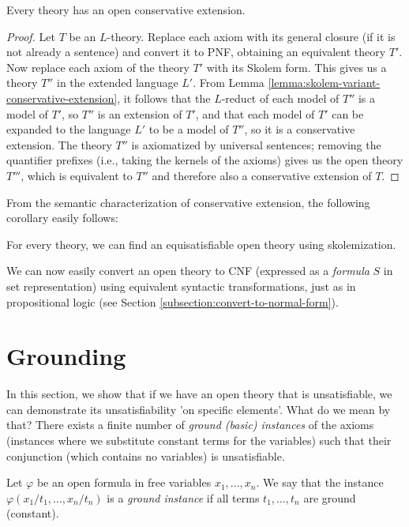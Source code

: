 \begin{theorem}
    Every theory has an open conservative extension.
\end{theorem}
\begin{proof}
    Let $T$ be an $L$-theory. Replace each axiom with its general closure (if it is not already a sentence) and convert it to PNF, obtaining an equivalent theory $T'$. Now replace each axiom of the theory $T'$ with its Skolem form. This gives us a theory $T''$ in the extended language $L'$. From Lemma \ref{lemma:skolem-variant-conservative-extension}, it follows that the $L$-reduct of each model of $T''$ is a model of $T'$, so $T''$ is an extension of $T'$, and that each model of $T'$ can be expanded to the language $L'$ to be a model of $T''$, so it is a conservative extension. The theory $T''$ is axiomatized by universal sentences; removing the quantifier prefixes (i.e., taking the kernels of the axioms) gives us the open theory $T'''$, which is equivalent to $T''$ and therefore also a conservative extension of $T$.
\end{proof}

From the semantic characterization of conservative extension, the following corollary easily follows:

\begin{corollary}
    For every theory, we can find an equisatisfiable open theory using skolemization.
\end{corollary}

We can now easily convert an open theory to CNF (expressed as a \emph{formula} $S$ in set representation) using equivalent syntactic transformations, just as in propositional logic (see Section \ref{subsection:convert-to-normal-form}).

\section{Grounding}\label{section:grounding}

In this section, we show that if we have an open theory that is unsatisfiable, we can demonstrate its unsatisfiability 'on specific elements'. What do we mean by that? There exists a finite number of \emph{ground (basic) instances} of the axioms (instances where we substitute constant terms for the variables) such that their conjunction (which contains no variables) is unsatisfiable.

\begin{definition}
    Let $\varphi$ be an open formula in free variables $x_1,\dots,x_n$. We say that the instance $\varphi(x_1/t_1,\dots,x_n/t_n)$ is a \emph{ground instance} if all terms $t_1,\dots,t_n$ are ground (constant).
\end{definition}

